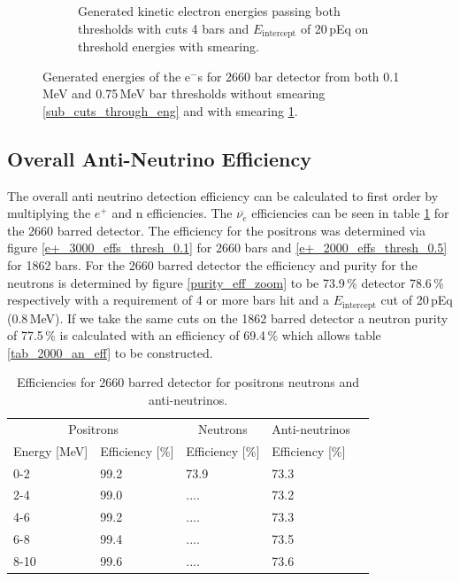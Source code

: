 \documentclass[12pt,a4paper]{article}
\begin{document}
\begin{figure}[H]
\begin{subfigure}{.5\textwidth}
  \captionsetup{width=.9\linewidth}
  \caption{Generated kinetic electron energies passing both thresholds with cuts 4 bars and $E_\textrm{intercept}$ of 20\,pEq on threshold energies with smearing.}
  \label{sub_cuts_through_png}
\end{subfigure}
\caption{Generated energies of the e$^-$s for 2660 bar detector from both 0.1\,MeV and 0.75\,MeV bar thresholds without smearing \ref{sub_cuts_through_eng} and with smearing \ref{sub_cuts_through_png}.}
\label{cuts_through_eng_png}
\end{figure}

\subsection{Overall Anti-Neutrino Efficiency}
The overall anti neutrino detection efficiency can be calculated to first order by multiplying the $e^+$ and n efficiencies. The $\overline{\nu_e}$ efficiencies can be seen in table \ref{tab_3000_an_eff} for the 2660 barred detector. The efficiency for the positrons was determined via figure \ref{e+_3000_effs_thresh_0.1} for 2660 bars and \ref{e+_2000_effs_thresh_0.5} for 1862 bars. For the 2660 barred detector the efficiency and purity for the neutrons is determined by figure \ref{purity_eff_zoom} to be 73.9\,\% detector 78.6\,\% respectively with a requirement of 4 or more bars hit and a $E_\textrm{intercept}$ cut of 20\,pEq (0.8\,MeV). If we take the same cuts on the 1862 barred detector a neutron purity of 77.5\,\% is calculated with an efficiency of 69.4\,\% which allows table \ref{tab_2000_an_eff} to be constructed. \\ 
\begin{table}[h]
\centering
\begin{tabular}{lllll}  
\toprule
\multicolumn{2}{c}{Positrons} & \multicolumn{1}{c}{Neutrons} & \multicolumn{1}{c}{Anti-neutrinos}
\\
\cmidrule(r){1-2}
\cmidrule(r){3-3}
\cmidrule(r){4-4}
Energy [MeV] & Efficiency [\%] & Efficiency [\%]  & Efficiency [\%]\\
\midrule
0-2          & 99.2            & 73.9             & 73.3\\
2-4          & 99.0            & ....             & 73.2\\
4-6          & 99.2            & ....             & 73.3\\
6-8          & 99.4            & ....             & 73.5\\
8-10         & 99.6            & ....             & 73.6\\
\bottomrule 
\end{tabular}
\caption{Efficiencies for 2660 barred detector for positrons neutrons and anti-neutrinos.}
\label{tab_3000_an_eff}
\end{table}
\end{document}
